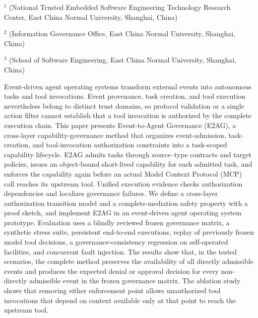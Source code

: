 \vspace{8pt}
\vspace{4pt}
\vspace{3pt}
\begingroup\fontsize{7.5pt}{10pt}\selectfont
\noindent$^{1}$ (National Trusted Embedded Software Engineering Technology Research Center, East China Normal University, Shanghai, China)\par
\noindent$^{2}$ (Information Governance Office, East China Normal University, Shanghai, China)\par
\noindent$^{3}$ (School of Software Engineering, East China Normal University, Shanghai, China)\par
\endgroup

\begin{josenabstract}
Event-driven agent operating systems transform external events into autonomous tasks and tool invocations. Event provenance, task creation, and tool execution nevertheless belong to distinct trust domains, so protocol validation or a single action filter cannot establish that a tool invocation is authorized by the complete execution chain. This paper presents Event-to-Agent Governance (E2AG), a cross-layer capability-governance method that organizes event-admission, task-creation, and tool-invocation authorization constraints into a task-scoped capability lifecycle. E2AG admits tasks through source--type contracts and target policies, issues an object-bound short-lived capability for each admitted task, and enforces the capability again before an actual Model Context Protocol (MCP) call reaches its upstream tool. Unified execution evidence checks authorization dependencies and localizes governance failures. We define a cross-layer authorization transition model and a complete-mediation safety property with a proof sketch, and implement E2AG in an event-driven agent operating system prototype. Evaluation uses a blindly reviewed frozen governance matrix, a synthetic stress suite, persistent end-to-end executions, replay of previously frozen model tool decisions, a governance-consistency regression on self-operated facilities, and concurrent fault injection. The results show that, in the tested scenarios, the complete method preserves the availability of all directly admissible events and produces the expected denial or approval decision for every non-directly admissible event in the frozen governance matrix. The ablation study shows that removing either enforcement point allows unauthorized tool invocations that depend on context available only at that point to reach the upstream tool.
\end{josenabstract}

\vspace{8pt}
